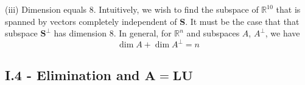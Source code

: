 \documentclass[a4paper]{article}
\begin{document}
\vspace{12pt}

(iii) Dimension equals 8. Intuitively, we wish to find the subspace of \(\mathbb{R}^{10}\) that is spanned by vectors completely independent of \textbf{S}. It must be the case that that subspace \(\textbf{S}^{\bm{\perp}}\) has dimension 8. In general, for \(\mathbb{R}^{n}\) and subspaces \(A\), \(A^{\perp}\), we have
\[
	\dim A + \dim A^{\perp} = n
\]

\newpage
\subsection{\textsf{I.4 - Elimination and \texorpdfstring{\(\bm{A = LU}\)}{A = LU}}}

\end{document}
